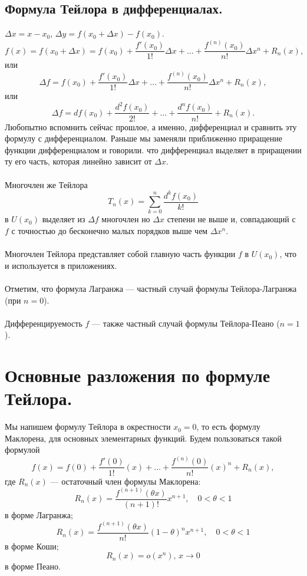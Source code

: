 	\subsection{Формула Тейлора в дифференциалах.}
	$\Delta x=x-x_0$, $\Delta y=f(x_0+ \Delta x)-f(x_0)$.
	$$f(x)=f(x_0+\Delta x)=f(x_0)+\frac{f'(x_0)}{1!}\Delta x+\ldots+\frac{f^{(n)}(x_0)}{n!}\Delta x^n+R_n(x),$$
	или $$\Delta f=f(x_0)+\frac{f'(x_0)}{1!}\Delta x+\ldots+\frac{f^{(n)}(x_0)}{n!}\Delta x^n+R_n(x),$$
	или $$\Delta f=df(x_0) + \frac{d^2f(x_0)}{2!}+\ldots+\frac{d^nf(x_0)}{n!}+R_n(x).$$
	Любопытно вспомнить сейчас прошлое, а именно, дифференциал и сравнить эту формулу с дифференциалом. Раньше мы заменяли приближенно приращение функции дифференциалом и говорили. что дифференциал выделяет в приращении ту его часть, которая линейно зависит от $\Delta x.$\\\\
	Многочлен же Тейлора $$T_n(x)=\sum_{k=0}^n \frac{d^k f(x_0)}{k!}$$  в $U(x_0)$
	выделяет из $\Delta f$ многочлен но $\Delta x$ степени не выше и, совпадающий с $f$ с точностью до
	бесконечно малых порядков выше чем $\Delta x^n$.\\\\
	Многочлен Тейлора представляет собой главную часть функции $f$ в $U(x_0)$, что и используется в приложениях.\\\\
	Отметим, что формула Лагранжа --- частный случай формулы Тейлора-Лагранжа (при $n=0$).\\\\
	Дифференцируемость $f$ --- также частный случай формулы Тейлора-Пеано ($n=1$).
	\section{Основные разложения по формуле Тейлора.}
	Мы напишем формулу Тейлора в окрестности $x_0=0$, то есть формулу Маклорена, для основных элементарных функций. Будем пользоваться такой формулой
	$$f(x)=f(0)+\frac{f'(0)}{1!}(x)+\dots+\frac{f^{(n)}(0)}{n!}(x)^n+R_n(x),$$ где $R_n(x)$ --- остаточный член формулы Маклорена:
	$$R_n(x)=\frac{f^{(n+1)}(\theta x)}{(n+1)!}x^{n+1},\quad 0<\theta<1$$ в форме Лагранжа;\\
	$$R_n(x)=\frac{f^{(n+1)}(\theta x)}{n!}(1-\theta)^n x^{n+1},\quad 0<\theta<1$$ в форме Коши;\\
	$$R_n(x)=o(x^n), \, x \to 0$$ в форме Пеано.
